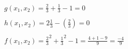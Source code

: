 \[
	\begin{array}{l}
		 g(x_1, x_2) = \frac{2}{3} + \frac{1}{3} - 1 = 0\\\\
   		 h(x_1, x_2) = 2\frac{1}{3} - (\frac{2}{3})= 0\\\\
		f(x_1, x_2) = \frac{2}{3}^{2} + \frac{1}{3}^{2} -1 = \frac{4+1-9}{9} = \frac{-4}{9} 
	\end{array}
\]